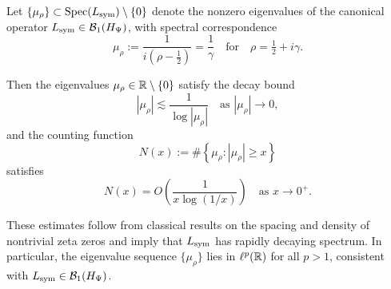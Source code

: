 \begin{lemma}
\label{lem:spectral_decay_bounds}
Let \( \{ \mu_\rho \} \subset \operatorname{Spec}(L_{\mathrm{sym}}) \setminus \{0\} \) denote the nonzero eigenvalues of the canonical operator \( L_{\mathrm{sym}} \in \mathcal{B}_1(H_{\Psi}) \), with spectral correspondence
\[
\mu_\rho := \frac{1}{i(\rho - \tfrac{1}{2})} = \frac{1}{\gamma}
\quad \text{for} \quad \rho = \tfrac{1}{2} + i\gamma.
\]

Then the eigenvalues \( \mu_\rho \in \mathbb{R} \setminus \{0\} \) satisfy the decay bound
\[
|\mu_\rho| \lesssim \frac{1}{\log |\mu_\rho|} \quad \text{as } |\mu_\rho| \to 0,
\]
and the counting function
\[
N(x) := \#\left\{ \mu_\rho : |\mu_\rho| \geq x \right\}
\]
satisfies
\[
N(x) = O\left( \frac{1}{x \log (1/x)} \right) \quad \text{as } x \to 0^+.
\]

\medskip
\noindent
These estimates follow from classical results on the spacing and density of nontrivial zeta zeros and imply that \( L_{\mathrm{sym}} \) has rapidly decaying spectrum. In particular, the eigenvalue sequence \( \{ \mu_\rho \} \) lies in \( \ell^p(\mathbb{R}) \) for all \( p > 1 \), consistent with \( L_{\mathrm{sym}} \in \mathcal{B}_1(H_{\Psi}) \).
\end{lemma}
